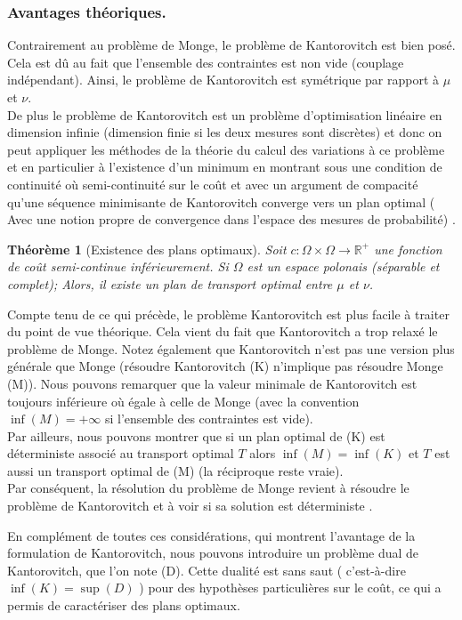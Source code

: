 \documentclass[
    8.2pt,
    a4paper,
    logo,
    twocolumn
]{template}
\newtheorem{theorem}{Théorème}
\begin{document}
    \subsubsection{Avantages théoriques.} Contrairement au problème de Monge, le problème de Kantorovitch est bien posé. Cela est dû au fait que l'ensemble des contraintes est non vide (couplage indépendant). Ainsi, le problème de Kantorovitch est symétrique par rapport à $\mu$ et $\nu$.\\
    De plus le problème de Kantorovitch est un problème d'optimisation linéaire en dimension infinie (dimension finie si les deux mesures sont discrètes) et donc on peut appliquer les méthodes de la théorie du calcul des variations  à ce problème et en particulier à l'existence d'un minimum en montrant sous une condition de continuité où semi-continuité sur le coût et avec un argument de compacité qu'une séquence minimisante de Kantorovitch converge vers un plan optimal ( Avec une notion propre de convergence dans l'espace des mesures de probabilité) \citep{Notes}.
    \begin{theorem}[Existence des plans optimaux]
            Soit $c : \Omega \times \Omega \rightarrow \mathbb{R}^+$ une fonction de coût semi-continue inférieurement. Si $\Omega$ est un espace polonais (séparable et complet); Alors, il existe un plan de transport optimal entre $\mu$ et $\nu$. \citep{santambrogio_optimal_2015}
    \end{theorem}

    Compte tenu de ce qui précède, le problème Kantorovitch est plus facile à traiter du point de vue théorique. Cela vient du fait que Kantorovitch a trop relaxé le problème de Monge. Notez également que Kantorovitch n'est pas une version plus générale que Monge (résoudre Kantorovitch (K) n'implique pas résoudre Monge (M)). Nous pouvons remarquer que la valeur minimale de Kantorovitch est toujours inférieure où égale à celle de Monge (avec la convention $\inf (M) = +\infty$ si l'ensemble des contraintes est vide). \\
    Par ailleurs, nous pouvons montrer que si un plan optimal de (K) est déterministe associé au transport optimal $T$ alors $\inf (M) = \inf (K)$ et $T$ est aussi un transport optimal de (M) (la réciproque reste vraie). \\
    Par conséquent, la résolution du problème de Monge revient à résoudre le problème de Kantorovitch et à voir si sa solution est déterministe \citep{santambrogio_optimal_2015}.

    En complément de toutes ces considérations, qui montrent l'avantage de la formulation de Kantorovitch, nous pouvons introduire un problème dual de Kantorovitch, que l'on note (D). Cette dualité est sans saut ( c'est-à-dire $\inf (K) = \sup (D)$ ) pour des hypothèses particulières sur le coût, ce qui a permis de caractériser des plans optimaux.
\end{document}
